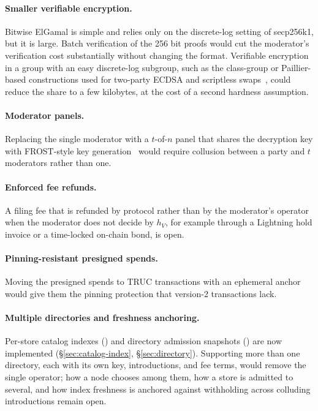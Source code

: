 \paragraph{Smaller verifiable encryption.} Bitwise ElGamal is simple and relies only on the discrete-log setting of secp256k1, but it is large. Batch verification of the 256 bit proofs would cut the moderator's verification cost substantially without changing the format. Verifiable encryption in a group with an easy discrete-log subgroup, such as the class-group or Paillier-based constructions used for two-party ECDSA and scriptless swaps~\citep{shlomovits2020juggling}, could reduce the share to a few kilobytes, at the cost of a second hardness assumption.

\paragraph{Moderator panels.} Replacing the single moderator with a $t$-of-$n$ panel that shares the decryption key with FROST-style key generation~\citep{komlo2020frost} would require collusion between a party and $t$ moderators rather than one.

\paragraph{Enforced fee refunds.} A filing fee that is refunded by protocol rather than by the moderator's operator when the moderator does not decide by $h_V$, for example through a Lightning hold invoice or a time-locked on-chain bond, is open.

\paragraph{Pinning-resistant presigned spends.} Moving the presigned spends to TRUC transactions with an ephemeral anchor would give them the pinning protection that version-2 transactions lack.

\paragraph{Multiple directories and freshness anchoring.} Per-store catalog indexes () and directory admission snapshots () are now implemented (\S\ref{sec:catalog-index}, \S\ref{sec:directory}). Supporting more than one directory, each with its own key, introductions, and fee terms, would remove the single operator; how a node chooses among them, how a store is admitted to several, and how index freshness is anchored against withholding across colluding introductions remain open.

